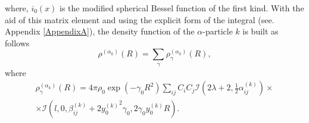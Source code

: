 \documentclass[
12pt, %
oneside, %
english, %
onehalfspacing, %
onehalfspacing, %
headsepline, %
]{MastersDoctoralThesis} %
\begin{document}
where, $i_0(x)$ is the modified spherical Bessel function of the first kind.
With the aid of this matrix element and using the explicit form of the integral (see. Appendix \ref{AppendixA}), the density function of the $\alpha$-particle $k$ is built as follows
\begin{equation}
\rho^{(\alpha_k)}(R)=\sum_\gamma \rho^{(\alpha_k)}_{\gamma}(R),
\label{rho_alphak}
\end{equation}
where
\begin{align}
\rho^{(\alpha_k)}_\gamma(R)= 
4 \pi \rho_0 \exp\left(-\gamma_0 R^2 \right)
\sum_{ij} C_i C_j 
 \mathcal{I}\left( 2\lambda+2, \tfrac{1}{2} \alpha^{(k)}_{ij}\right) \times \\
 \times \mathcal{I}\left( l,0,\beta_{ij}^{(k)}+2{y^{(k)}_0}^2 \gamma_0,2\gamma_0 y^{(k)}_0 R \right). \nonumber
\end{align}
\end{document}
